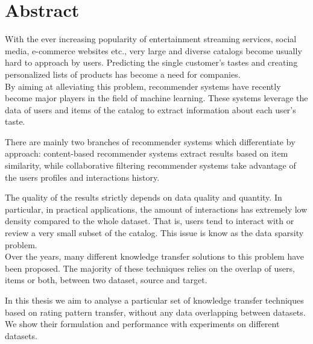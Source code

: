 \chapter*{Abstract}

With the ever increasing popularity of entertainment streaming services, social media, e-commerce websites etc., very large and diverse catalogs become usually hard to approach by users. Predicting the single customer's tastes and creating personalized lists of products has become a need for companies.\\
By aiming at alleviating this problem, recommender systems have recently become major players in the field of machine learning. These systems leverage the data of users and items of the catalog to extract information about each user's taste.\par
There are mainly two branches of recommender systems which differentiate by approach:
content-based recommender systems extract results based on item similarity, while collaborative filtering recommender systems take advantage of the users profiles and interactions history.\par
The quality of the results strictly depends on data quality and quantity. In particular, in practical applications, the amount of interactions has extremely low density compared to the whole dataset. That is, users tend to interact with or review a very small subset of the catalog. This issue is know as the data sparsity problem.\\
Over the years, many different knowledge transfer solutions to this problem have been proposed. The majority of these techniques relies on the overlap of users, items or both, between two dataset, source and target.\par
In this thesis we aim to analyse a particular set of knowledge transfer techniques based on rating pattern transfer, without any data overlapping between datasets. We show their formulation and performance with experiments on different datasets.